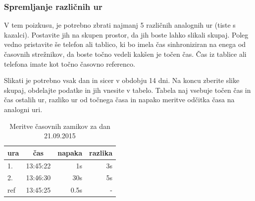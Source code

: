 \documentclass[11pt]{article}
\begin{document}
\subsubsection{Spremljanje različnih ur}
V tem poizkusu, je potrebno zbrati najmanj 5 različnih analognih ur (tiste s kazalci). Postavite jih na skupen prostor, da jih boste lahko slikali skupaj. Poleg vedno pristavite še telefon ali tablico, ki bo imela čas sinhroniziran na enega od časovnih strežnikov, da boste točno vedeli kakšen je točen čas. Čas iz tablice ali telefona imate kot točno časovno referenco. 

Slikati je potrebno vsak dan in sicer v obdobju 14 dni. Na koncu zberite slike skupaj, obdelajte podatke in jih vnesite v tabelo. Tabela naj vsebuje točen čas in čas ostalih ur, razliko ur od točnega časa in napako meritve odčitka časa na analogni uri.

\begin{table}
	\centering
	\caption{Meritve časovnih zamikov za dan 21.09.2015}
	\label{tab:v_cas_meritev} 
	\begin{tabular}{l||c|r|r}
		\hline
		ura & čas & napaka & razlika  \\
	    \hline\hline\noalign{\smallskip}
		1.  & 13:45:22 & 1s   & 3s\\
		2.  & 13:46:30 & 30s  & 5s\\
		ref & 13:45:25 & 0.5s & - 
	\end{tabular}
\end{table}
\end{document}
